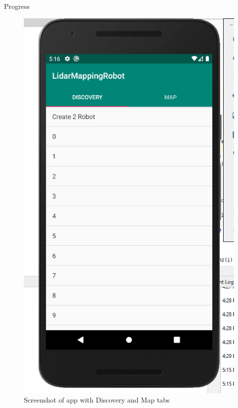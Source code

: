 \documentclass{beamer}
\begin{document}
\begin{frame}{Progress}{}
    \begin{figure}
        \centering
        \includegraphics[scale=0.3]{figs/img/screenshot1}
        \caption{Screenshot of app with Discovery and Map tabs}
        \label{fig:my_label}
    \end{figure}
\end{frame}
\end{document}
